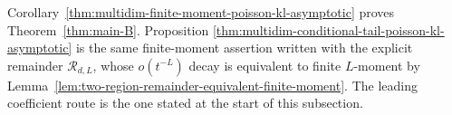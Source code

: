 \begin{remark}
Corollary~\ref{thm:multidim-finite-moment-poisson-kl-asymptotic} proves
Theorem~\ref{thm:main-B}.  Proposition
\ref{thm:multidim-conditional-tail-poisson-kl-asymptotic} is the same
finite-moment assertion written with the explicit remainder
\(\mathcal R_{d,L}\), whose \(o(t^{-L})\) decay is equivalent to finite
\(L\)-moment by
Lemma~\ref{lem:two-region-remainder-equivalent-finite-moment}.  The leading
coefficient route is the one stated at the start of this subsection.
\end{remark}
